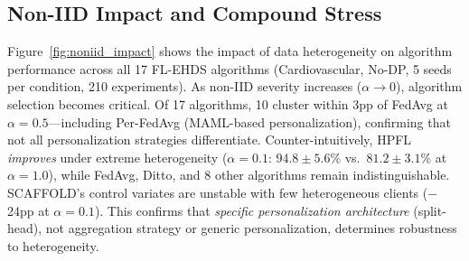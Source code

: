 \documentclass[conference]{IEEEtran}
\begin{document}
\subsection{Non-IID Impact and Compound Stress}

Figure~\ref{fig:noniid_impact} shows the impact of data heterogeneity on algorithm performance across all 17 FL-EHDS algorithms (Cardiovascular, No-DP, 5 seeds per condition, 210 experiments). As non-IID severity increases ($\alpha \to 0$), algorithm selection becomes critical. Of 17 algorithms, 10 cluster within 3pp of FedAvg at $\alpha{=}0.5$---including Per-FedAvg (MAML-based personalization), confirming that not all personalization strategies differentiate. Counter-intuitively, HPFL \textit{improves} under extreme heterogeneity ($\alpha{=}0.1$: $94.8 \pm 5.6$\% vs.\ $81.2 \pm 3.1$\% at $\alpha{=}1.0$), while FedAvg, Ditto, and 8 other algorithms remain indistinguishable. SCAFFOLD's control variates are unstable with few heterogeneous clients ($-$24pp at $\alpha{=}0.1$). This confirms that \textit{specific personalization architecture} (split-head), not aggregation strategy or generic personalization, determines robustness to heterogeneity.
\end{document}
